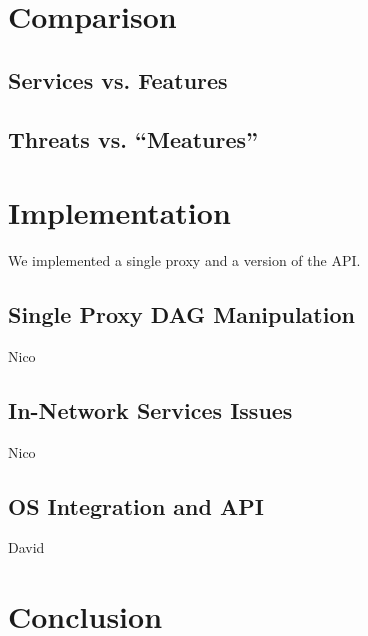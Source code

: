 \documentclass{article}
\begin{document}
\section{Comparison}
\label{comparison}
\subsection{Services vs. Features}
\subsection{Threats vs. ``Meatures''}


\section{Implementation}
\label{implementation}
We implemented a single proxy and a version of the API.
\subsection{Single Proxy DAG Manipulation}
Nico
\subsection{In-Network Services Issues}
Nico
\subsection{OS Integration and API}
David

\section{Conclusion}
\label{conclusion}

{}

\end{document}
